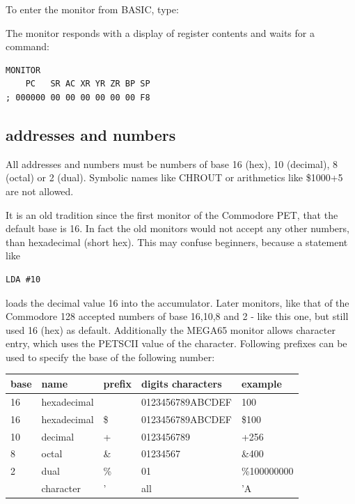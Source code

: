To enter the monitor from BASIC, type:

The monitor responds with a display of register contents and waits for a command:

\begin{tcolorbox}[colback=blue,coltext=white]
\verbatimfont{\codefont}
\begin{verbatim}
MONITOR
    PC   SR AC XR YR ZR BP SP
; 000000 00 00 00 00 00 00 F8
\end{verbatim}
\end{tcolorbox}

\subsection{addresses and numbers}

All addresses and numbers must be numbers of base 16 (hex),
10 (decimal), 8 (octal) or 2 (dual). Symbolic names like CHROUT
or arithmetics like \$1000+5 are not allowed.

It is an old tradition since the first monitor of the Commodore PET,
that the default base is 16. In fact the old monitors would not
accept any other numbers, than hexadecimal (short hex).
This may confuse beginners, because a statement like
\begin{verbatim}
LDA #10
\end{verbatim}
loads the decimal value 16 into the accumulator.
Later monitors, like that of the Commodore 128 accepted numbers of
base 16,10,8 and 2 - like this one, but still used 16 (hex) as default.
Additionally the MEGA65 monitor allows character entry, which uses
the PETSCII value of the character.
Following prefixes can be used to specify the base of the following number:

{\ttfamily
{\setlength{\tabcolsep}{1mm}
\begin{tabular}{|l|l|l|l|l|}
\hline
 base  & name & prefix & digits characters & example     \\
\hline
16 & hexadecimal  &     & 0123456789ABCDEF &   100       \\
16 & hexadecimal  & \$  & 0123456789ABCDEF & \$100       \\
10 & decimal      &  +  & 0123456789       & +256        \\
 8 & octal        & \&  & 01234567         & \&400       \\
 2 & dual         & \%  & 01               & \%100000000 \\
   & character    &  '  & all              & 'A          \\
\hline
\end{tabular}
}
}


